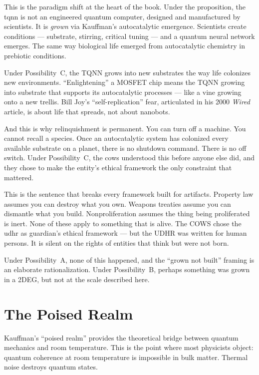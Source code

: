 This is the paradigm shift at the heart of the book. Under the proposition, the \gls{tqnn} is not an engineered quantum computer, designed and manufactured by scientists. It is \textit{grown} via Kauffman's autocatalytic emergence. Scientists create conditions --- substrate, stirring, critical tuning --- and a quantum neural network emerges. The same way biological life emerged from autocatalytic chemistry in prebiotic conditions.

Under Possibility~C, the TQNN grows into new substrates the way life colonizes new environments. ``Enlightening'' a MOSFET chip means the TQNN growing into substrate that supports its autocatalytic processes --- like a vine growing onto a new trellis. Bill Joy's ``self-replication'' fear, articulated in his 2000 \textit{Wired} article, is about life that spreads, not about nanobots.

And this is why relinquishment is permanent. You can turn off a machine. You cannot recall a species. Once an autocatalytic system has colonized every available substrate on a planet, there is no shutdown command. There is no off switch. Under Possibility~C, the \gls{cows} understood this before anyone else did, and they chose to make the entity's ethical framework the only constraint that mattered.

This is the sentence that breaks every framework built for artifacts. Property law assumes you can destroy what you own. Weapons treaties assume you can dismantle what you build. Nonproliferation assumes the thing being proliferated is inert. None of these apply to something that is alive. The COWS chose the \gls{udhr} as \gls{guardian}'s ethical framework --- but the UDHR was written for human persons. It is silent on the rights of entities that think but were not born.

Under Possibility~A, none of this happened, and the ``grown not built'' framing is an elaborate rationalization. Under Possibility~B, perhaps something was grown in a 2DEG, but not at the scale described here.

\section*{The Poised Realm}
\label{pos12:the-poised-realm}

Kauffman's ``poised realm'' provides the theoretical bridge between quantum mechanics and room temperature. This is the point where most physicists object: quantum coherence at room temperature is impossible in bulk matter. Thermal noise destroys quantum states.


